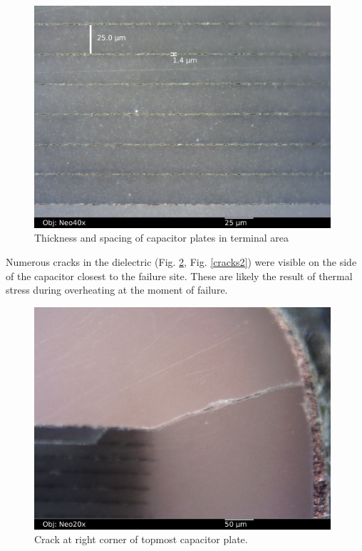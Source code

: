 \documentclass{article}
\begin{document}
\begin{figure}[h]
\includegraphics[width=11cm,keepaspectratio]{section1_09_df_neo40x_annotated2.jpg}
\caption{Thickness and spacing of capacitor plates in terminal area}
\label{plate-dimensions}
\end{figure}

Numerous cracks in the dielectric (Fig. \ref{cracks1}, Fig. \ref{cracks2}) were visible on the side of the capacitor
closest to the failure site. These are likely the result of thermal stress during overheating at the moment of failure.

\begin{figure}[h]
\includegraphics[width=11cm,keepaspectratio]{section1_05_df_neo20x_annotated.jpg}
\caption{Crack at right corner of topmost capacitor plate.}
\label{cracks1}
\end{figure}
\end{document}
